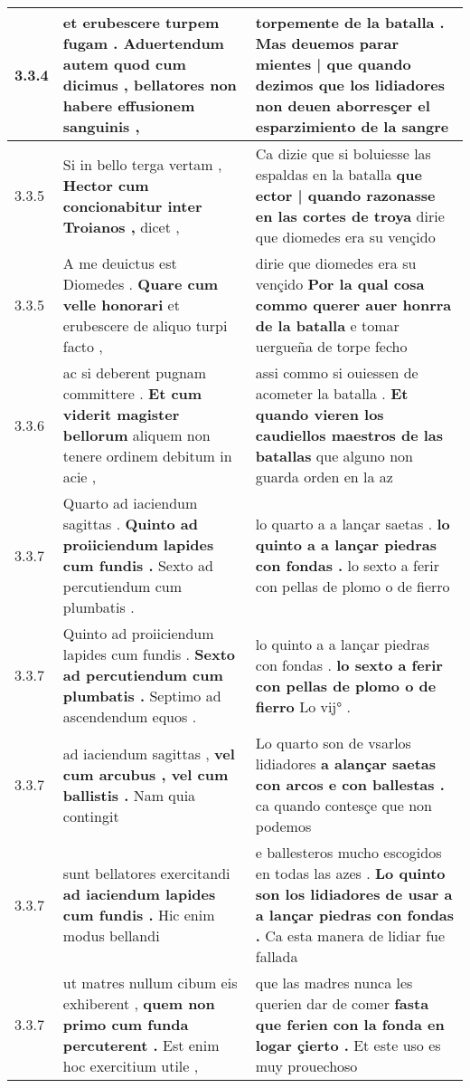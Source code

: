\begin{tabular}{|p{1cm}|p{6.5cm}|p{6.5cm}|}
3.3.4 & et erubescere turpem fugam . \textbf{ Aduertendum autem quod cum dicimus , } bellatores non habere effusionem sanguinis , & torpemente de la batalla . \textbf{ Mas deuemos parar mientes | que quando dezimos } que los lidiadores non deuen aborresçer el esparzimiento de la sangre \\\hline
3.3.5 & Si in bello terga vertam , \textbf{ Hector cum concionabitur inter Troianos , } dicet , & Ca dizie que si boluiesse las espaldas en la batalla \textbf{ que ector | quando razonasse en las cortes de troya } dirie que diomedes era su vençido \\\hline
3.3.5 & A me deuictus est Diomedes . \textbf{ Quare cum velle honorari } et erubescere de aliquo turpi facto , & dirie que diomedes era su vençido \textbf{ Por la qual cosa commo querer auer honrra de la batalla } e tomar uergueña de torpe fecho \\\hline
3.3.6 & ac si deberent pugnam committere . \textbf{ Et cum viderit magister bellorum } aliquem non tenere ordinem debitum in acie , & assi commo si ouiessen de acometer la batalla . \textbf{ Et quando vieren los caudiellos maestros de las batallas } que alguno non guarda orden en la az \\\hline
3.3.7 & Quarto ad iaciendum sagittas . \textbf{ Quinto ad proiiciendum lapides cum fundis . } Sexto ad percutiendum cum plumbatis . & lo quarto a a lançar saetas . \textbf{ lo quinto a a lançar piedras con fondas . } lo sexto a ferir con pellas de plomo o de fierro \\\hline
3.3.7 & Quinto ad proiiciendum lapides cum fundis . \textbf{ Sexto ad percutiendum cum plumbatis . } Septimo ad ascendendum equos . & lo quinto a a lançar piedras con fondas . \textbf{ lo sexto a ferir con pellas de plomo o de fierro } Lo vij° . \\\hline
3.3.7 & ad iaciendum sagittas , \textbf{ vel cum arcubus , vel cum ballistis . } Nam quia contingit & Lo quarto son de vsarlos lidiadores \textbf{ a alançar saetas con arcos e con ballestas . } ca quando contesçe que non podemos \\\hline
3.3.7 & sunt bellatores exercitandi \textbf{ ad iaciendum lapides cum fundis . } Hic enim modus bellandi & e ballesteros mucho escogidos en todas las azes . \textbf{ Lo quinto son los lidiadores de usar a a lançar piedras con fondas . } Ca esta manera de lidiar fue fallada \\\hline
3.3.7 & ut matres nullum cibum eis exhiberent , \textbf{ quem non primo cum funda percuterent . } Est enim hoc exercitium utile , & que las madres nunca les querien dar de comer \textbf{ fasta que ferien con la fonda en logar çierto . } Et este uso es muy prouechoso \\\hline

\end{tabular}
